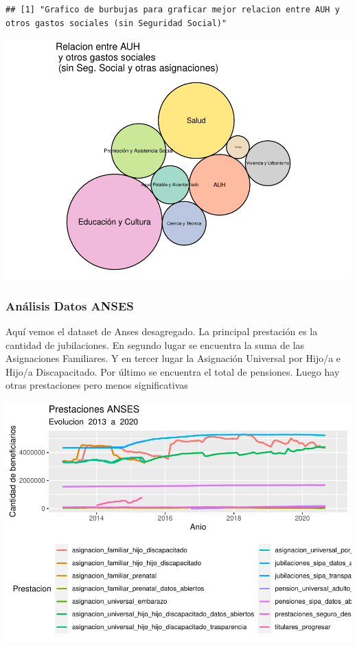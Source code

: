 \documentclass[
  12,
]{article}
\begin{document}
\begin{verbatim}
## [1] "Grafico de burbujas para graficar mejor relacion entre AUH y otros gastos sociales (sin Seguridad Social)"
\end{verbatim}

\includegraphics{Grupo4_Final_files/figure-latex/graficos_presu_6-2.pdf}

\hypertarget{anuxe1lisis-datos-anses}{%
\subsubsection{Análisis Datos ANSES}\label{anuxe1lisis-datos-anses}}

Aquí vemos el dataset de Anses desagregado. La principal prestación es
la cantidad de jubilaciones. En segundo lugar se encuentra la suma de
las Asignaciones Familiares. Y en tercer lugar la Asignación Universal
por Hijo/a e Hijo/a Discapacitado. Por último se encuentra el total de
pensiones. Luego hay otras prestaciones pero menos significativas

\includegraphics{Grupo4_Final_files/figure-latex/grafico_prestaciones_desagredadas-1.pdf}
\end{document}
